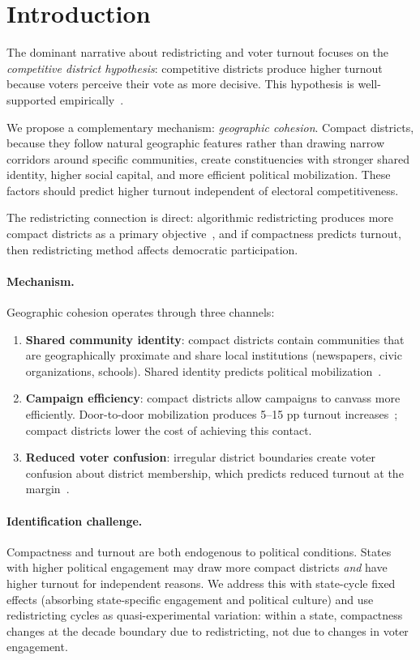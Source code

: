 \section{Introduction}

The dominant narrative about redistricting and voter turnout focuses on
the \emph{competitive district hypothesis}: competitive districts produce
higher turnout because voters perceive their vote as more decisive.
This hypothesis is well-supported empirically~\citep{cox1988closed, jacobson2015politics}.

We propose a complementary mechanism: \emph{geographic cohesion}.
Compact districts, because they follow natural geographic features rather
than drawing narrow corridors around specific communities, create constituencies
with stronger shared identity, higher social capital, and more efficient
political mobilization.
These factors should predict higher turnout independent of electoral
competitiveness.

The redistricting connection is direct: algorithmic redistricting produces
more compact districts as a primary objective~\citep{dellaLibera2026b2},
and if compactness predicts turnout, then redistricting method affects
democratic participation.

\paragraph{Mechanism.}
Geographic cohesion operates through three channels:
\begin{enumerate}
  \item \textbf{Shared community identity}: compact districts contain
    communities that are geographically proximate and share local institutions
    (newspapers, civic organizations, schools). Shared identity predicts
    political mobilization~\citep{putnam2000bowling}.
  \item \textbf{Campaign efficiency}: compact districts allow campaigns to
    canvass more efficiently. Door-to-door mobilization produces 5--15 pp
    turnout increases~\citep{gerber2000effects}; compact districts lower
    the cost of achieving this contact.
  \item \textbf{Reduced voter confusion}: irregular district boundaries
    create voter confusion about district membership, which predicts
    reduced turnout at the margin~\citep{mcnulty2009study}.
\end{enumerate}

\paragraph{Identification challenge.}
Compactness and turnout are both endogenous to political conditions.
States with higher political engagement may draw more compact districts
\emph{and} have higher turnout for independent reasons.
We address this with state-cycle fixed effects (absorbing state-specific
engagement and political culture) and use redistricting cycles as
quasi-experimental variation: within a state, compactness changes at
the decade boundary due to redistricting, not due to changes in voter
engagement.
